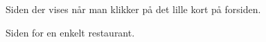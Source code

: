 \documentclass[a4paper, 12pt]{article}
\begin{document}
\begin{figure}[hp]
  \centering
  \caption{Siden der vises når man klikker på det lille kort på forsiden.}
\end{figure}


\begin{figure}[hp]
  \centering
  \caption{Siden for en enkelt restaurant.}
\end{figure}
\end{document}
